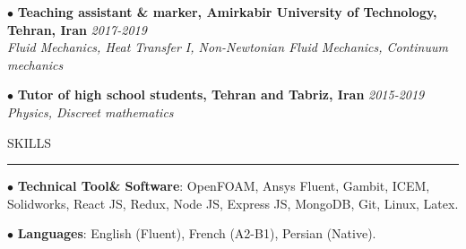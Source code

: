 \documentclass[10.5pt]{article}
\begin{document}
		{\noindent $\bullet$ \bf Teaching assistant \& marker, Amirkabir University of Technology, Tehran, Iran} \hfill {\em 2017-2019} 
		\\ \textit{Fluid Mechanics, Heat Transfer I, Non-Newtonian Fluid Mechanics, Continuum mechanics}
		
		\vspace{1.5mm}
		
		{\noindent $\bullet$ \bf Tutor of high school students, Tehran and Tabriz, Iran} \hfill {\em 2015-2019} 
		\\ \textit{Physics, Discreet mathematics}
		
		
		
		
		
		
		
	
		
		\vspace{2.5mm}
		
		\noindent SKILLS
		
		\vspace{-2mm}
		
		\noindent\rule[0.5ex]{\linewidth}{1pt}
		
		{\noindent $\bullet$ \bf Technical Tool\& Software}: OpenFOAM, Ansys Fluent, Gambit, ICEM, Solidworks, React JS, Redux, Node JS, Express JS, MongoDB, Git, Linux, Latex.
		
		\vspace{1.5mm}
		
		{\noindent $\bullet$ \bf Languages}: English (Fluent), French (A2-B1), Persian (Native).
		
		
		
		
		
		
		
\end{document}
